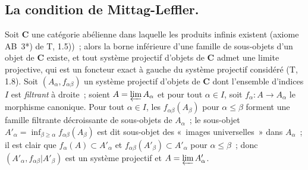 \subsection{La condition de Mittag-Leffler.}
\label{subsection:0.13.1-fr}

\begin{env}[13.1.1]
\label{0.13.1.1-fr}
Soit $\boldsymbol{C}$ une catégorie abélienne dans laquelle les produits infinis
existent (axiome AB~3*) de T, 1.5))~; alors la borne inférieure d'une famille
de sous-objets d'un objet de $\boldsymbol{C}$ existe, et tout système projectif
d'objets de $\boldsymbol{C}$ admet une limite projective, qui est un foncteur
exact à gauche du système projectif considéré (T, 1.8). Soit
$(A_\alpha,f_{\alpha\beta})$
un système projectif d'objets de $\boldsymbol{C}$ dont l'ensemble d'indices $I$
est \emph{filtrant} à droite~; soient $A=\varprojlim A_\alpha$ et pour tout
$\alpha\in I$, soit $f_\alpha:A\to A_\alpha$ le morphisme canonique. Pour
tout $\alpha\in I$, les $f_{\alpha\beta}(A_\beta)$ pour
$\alpha\leq\beta$ forment une famille filtrante décroissante de sous-objets
de $A_\alpha$~; le sous-objet $A'_\alpha=\inf_{\beta\geq\alpha}f_{\alpha\beta}(A_\beta)$
est dit sous-objet des «~images universelles~» dans $A_\alpha$~; il est
clair que $f_\alpha(A)\subset A'_\alpha$ et
$f_{\alpha\beta}(A'_\beta)\subset A'_\alpha$ pour
$\alpha\leq\beta$~; donc
$(A'_\alpha,f_{\alpha\beta}|A'_\beta)$ est un système projectif et
$A=\varprojlim A'_\alpha$.
\end{env}

